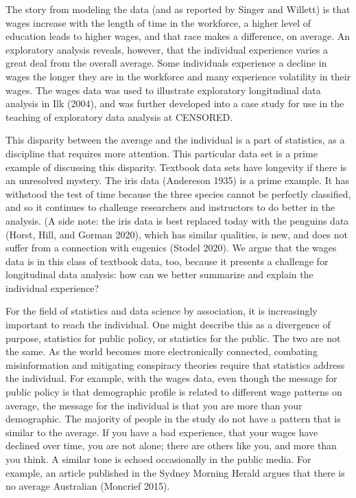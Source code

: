 \documentclass[12pt]{article}
\begin{document}
The story from modeling the data (and as reported by Singer and Willett) is that wages increase with the length of time in the workforce, a higher level of education leads to higher wages, and that race makes a difference, on average. An exploratory analysis reveals, however, that the individual experience varies a great deal from the overall average. Some individuals experience a decline in wages the longer they are in the workforce and many experience volatility in their wages. The wages data was used to illustrate exploratory longitudinal data analysis in Ilk (2004), and was further developed into a case study for use in the teaching of exploratory data analysis at CENSORED.

This disparity between the average and the individual is a part of statistics, as a discipline that requires more attention. This particular data set is a prime example of discussing this disparity. Textbook data sets have longevity if there is an unresolved mystery. The iris data (Andereson 1935) is a prime example. It has withstood the test of time because the three species cannot be perfectly classified, and so it continues to challenge researchers and instructors to do better in the analysis. (A side note: the iris data is best replaced today with the penguins data (Horst, Hill, and Gorman 2020), which has similar qualities, is new, and does not suffer from a connection with eugenics (Stodel 2020). We argue that the wages data is in this class of textbook data, too, because it presents a challenge for longitudinal data analysis: how can we better summarize and explain the individual experience?

For the field of statistics and data science by association, it is increasingly important to reach the individual. One might describe this as a divergence of purpose, statistics for public policy, or statistics for the public. The two are not the same. As the world becomes more electronically connected, combating misinformation and mitigating conspiracy theories require that statistics address the individual. For example, with the wages data, even though the message for public policy is that demographic profile is related to different wage patterns on average, the message for the individual is that you are more than your demographic. The majority of people in the study do not have a pattern that is similar to the average. If you have a bad experience, that your wages have declined over time, you are not alone; there are others like you, and more than you think. A similar tone is echoed occasionally in the public media. For example, an article published in the Sydney Morning Herald argues that there is no average Australian (Moncrief 2015).
\end{document}
